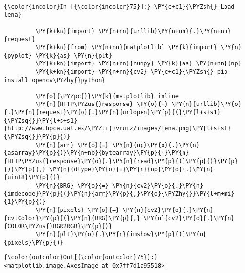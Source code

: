     \begin{center}
    \end{center}
    { \hspace*{\fill} \\}
    
    \begin{Verbatim}[commandchars=\\\{\}]
{\color{incolor}In [{\color{incolor}75}]:} \PY{c+c1}{\PYZsh{} Load lena}
         
         \PY{k+kn}{import} \PY{n+nn}{urllib}\PY{n+nn}{.}\PY{n+nn}{request}
         \PY{k+kn}{from} \PY{n+nn}{matplotlib} \PY{k}{import} \PY{n}{pyplot} \PY{k}{as} \PY{n}{plt}
         \PY{k+kn}{import} \PY{n+nn}{numpy} \PY{k}{as} \PY{n+nn}{np}
         \PY{k+kn}{import} \PY{n+nn}{cv2} \PY{c+c1}{\PYZsh{} pip install opencv\PYZhy{}python}
         
         \PY{o}{\PYZpc{}}\PY{k}{matplotlib} inline
         \PY{n}{HTTP\PYZus{}response} \PY{o}{=} \PY{n}{urllib}\PY{o}{.}\PY{n}{request}\PY{o}{.}\PY{n}{urlopen}\PY{p}{(}\PY{l+s+s1}{\PYZsq{}}\PY{l+s+s1}{http://www.hpca.ual.es/\PYZti{}vruiz/images/lena.png}\PY{l+s+s1}{\PYZsq{}}\PY{p}{)}
         \PY{n}{arr} \PY{o}{=} \PY{n}{np}\PY{o}{.}\PY{n}{asarray}\PY{p}{(}\PY{n+nb}{bytearray}\PY{p}{(}\PY{n}{HTTP\PYZus{}response}\PY{o}{.}\PY{n}{read}\PY{p}{(}\PY{p}{)}\PY{p}{)}\PY{p}{,} \PY{n}{dtype}\PY{o}{=}\PY{n}{np}\PY{o}{.}\PY{n}{uint8}\PY{p}{)}
         \PY{n}{BRG} \PY{o}{=} \PY{n}{cv2}\PY{o}{.}\PY{n}{imdecode}\PY{p}{(}\PY{n}{arr}\PY{p}{,}\PY{o}{\PYZhy{}}\PY{l+m+mi}{1}\PY{p}{)}
         \PY{n}{pixels} \PY{o}{=} \PY{n}{cv2}\PY{o}{.}\PY{n}{cvtColor}\PY{p}{(}\PY{n}{BRG}\PY{p}{,} \PY{n}{cv2}\PY{o}{.}\PY{n}{COLOR\PYZus{}BGR2RGB}\PY{p}{)}
         \PY{n}{plt}\PY{o}{.}\PY{n}{imshow}\PY{p}{(}\PY{n}{pixels}\PY{p}{)}
\end{Verbatim}


\begin{Verbatim}[commandchars=\\\{\}]
{\color{outcolor}Out[{\color{outcolor}75}]:} <matplotlib.image.AxesImage at 0x7ff7d1a95518>
\end{Verbatim}
            
    \begin{center}
    \end{center}
    { \hspace*{\fill} \\}
    
